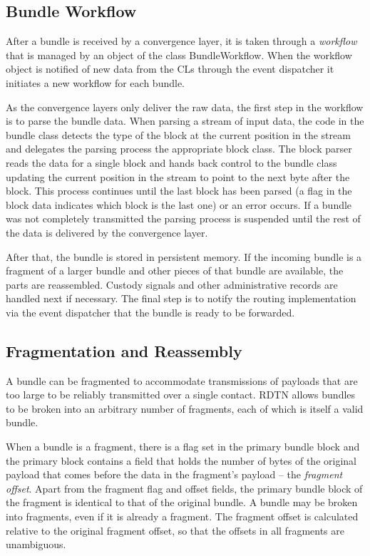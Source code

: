 \documentclass[a4paper]{article}
\begin{document}
\subsection{Bundle Workflow}\label{sec.workflow}

After a bundle is received by a convergence layer, it is taken through a {\em
workflow} that is managed by an object of the class BundleWorkflow. When the
workflow object is notified of new data from the CLs through the event
dispatcher it initiates a new workflow for each bundle.

As the convergence layers only deliver the raw data, the first step in the
workflow is to parse the bundle data.  When parsing a stream of input
data, the code in the bundle class detects the type of the block at the current
position in the stream and delegates the parsing process the appropriate block
class. The block parser reads the data for a single block and hands back control
to the bundle class updating the current position in the stream to point to the
next byte after the block. This process continues until the last block has been
parsed (a flag in the block data indicates which block is the last one) or an
error occurs. If a bundle was not completely transmitted the parsing process is
suspended until the rest of the data is delivered by the convergence layer.

After that, the bundle is stored in persistent memory. If the incoming
bundle is a fragment of a larger bundle and other pieces of that bundle are
available, the parts are reassembled. Custody signals and other
administrative records are handled next if necessary. The final step is to
notify the routing implementation via the event dispatcher that the bundle is
ready to be forwarded.

\subsection{Fragmentation and Reassembly}\label{sec.frag}

A bundle can be fragmented to accommodate transmissions of payloads that are too
large to be reliably transmitted over a single contact. RDTN allows bundles to
be broken into an arbitrary number of fragments, each of which is itself a valid
bundle. 

When a bundle is a fragment, there is a flag set in the primary bundle block and
the primary block contains a field that holds the number of bytes of the
original payload that comes before the data in the fragment's payload -- the
{\em fragment offset}. Apart from the fragment flag and offset fields, the
primary bundle block of the fragment is identical to that of the original
bundle. A bundle may be broken into fragments, even if it is already a fragment.
The fragment offset is calculated relative to the original fragment offset, so
that the offsets in all fragments are unambiguous.
\end{document}
